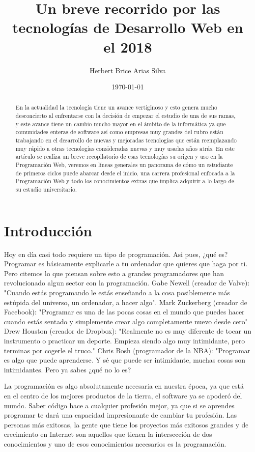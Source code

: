 \documentclass[a4paper]{article}
\title{Un breve recorrido por las tecnologías de Desarrollo Web en el 2018 }
\author{Herbert Brice Arias Silva}
\date{\today}
\begin{document}
\maketitle

\begin{abstract}
   En la actualidad la tecnología tiene un avance vertiginoso y esto genera
   mucho desconcierto al enfrentarse con la decisión de empezar el estudio de
   una de sus ramas, y este avance tiene un cambio mucho mayor en el ámbito de
   la informática ya que comunidades enteras de software así como empresas muy
   grandes del rubro están trabajando en el desarrollo de nuevas y mejoradas
   tecnologías que están reemplazando muy rápido a otras tecnologías
   consideradas nuevas y muy usadas años atrás. En este artículo se realiza un
   breve recopilatorio de esas tecnologías su origen y uso en la Programación
   Web, veremos en líneas generales un panorama de cómo un estudiante de
   primeros ciclos puede abarcar desde el inicio, una carrera profesional
   enfocada a la Programación Web y todo los conocimientos extras que implica
   adquirir a lo largo de su estudio universitario.
\end{abstract}

\section{Introducción}
Hoy en día casi todo requiere un tipo de programación. Asi pues, ¿qué es?
Programar es básicamente explicarle a tu ordenador que quieres que haga por ti.
Pero citemos lo que piensan sobre esto a grandes programadores que han
revolucionado algun sector con la programación.
Gabe Newell (creador de Valve): "Cuando estás programando le estás enseñando a la cosa posiblemente más
estúpida del universo, un ordenador, a hacer algo".
Mark Zuckerberg (creador de Facebook): "Programar es una de las pocas cosas en el mundo que puedes
hacer cuando estás sentado y simplemente crear algo completamente nuevo desde
cero"
Drew Houston (creador de Dropbox): "Realmente no es muy diferente de tocar un instrumento o
practicar un deporte. Empieza siendo algo muy intimidante, pero terminas por
cogerle el truco."
Chris Bosh (programador de la NBA): "Programar es algo que puede aprenderse. Y sé que puede ser
intimidante, muchas cosas son intimidantes. Pero ya sabes ¿qué no lo es?

La programación es algo absolutamente necesaria en nuestra época, ya que está
en el centro de los mejores productos de la tierra, el software ya se apoderó
del mundo. Saber código hace a cualquier profesión mejor, ya que si se aprendes
programar te dará una capacidad impresionante de cambiar tu profesión. Las
personas más exitosas, la gente que tiene los proyectos más exitosos grandes y
de crecimiento en Internet son aquellos que tienen la intersección de dos
conocimientos y uno de esos conocimientos necesarios es la programación.
\end{document}
